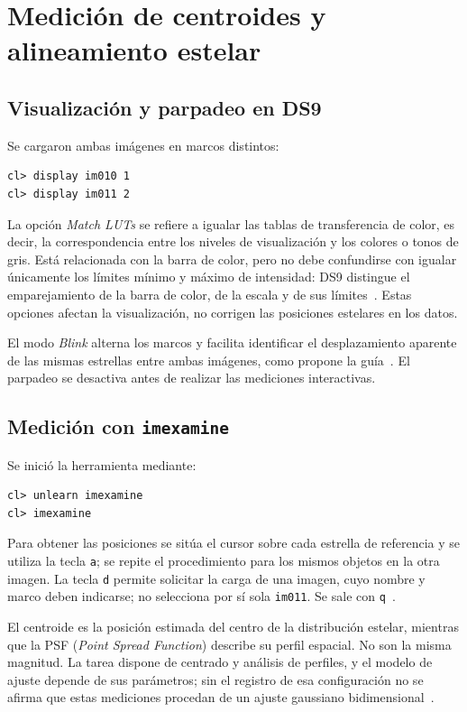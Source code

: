 \documentclass[11pt,a4paper]{article}
\begin{document}
\section{Medición de centroides y alineamiento estelar}

\subsection{Visualización y parpadeo en DS9}
Se cargaron ambas imágenes en marcos distintos:
\begin{verbatim}
cl> display im010 1
cl> display im011 2
\end{verbatim}

La opción \emph{Match LUTs} se refiere a igualar las tablas de
transferencia de color, es decir, la correspondencia entre los niveles
de visualización y los colores o tonos de gris. Está relacionada con
la barra de color, pero no debe confundirse con igualar únicamente los
límites mínimo y máximo de intensidad: DS9 distingue el emparejamiento
de la barra de color, de la escala y de sus límites~\cite{ds9}.
Estas opciones afectan la visualización, no corrigen las posiciones
estelares en los datos.

El modo \emph{Blink} alterna los marcos y facilita identificar el
desplazamiento aparente de las mismas estrellas entre ambas imágenes,
como propone la guía~\cite{guia}. El parpadeo se desactiva antes de
realizar las mediciones interactivas.

\subsection{Medición con \texttt{imexamine}}
Se inició la herramienta mediante:
\begin{verbatim}
cl> unlearn imexamine
cl> imexamine
\end{verbatim}
Para obtener las posiciones se sitúa el cursor sobre cada estrella de
referencia y se utiliza la tecla \texttt{a}; se repite el procedimiento
para los mismos objetos en la otra imagen. La tecla \texttt{d} permite
solicitar la carga de una imagen, cuyo nombre y marco deben indicarse;
no selecciona por sí sola \texttt{im011}. Se sale con
\texttt{q}~\cite{iraf}.

El centroide es la posición estimada del centro de la distribución
estelar, mientras que la PSF (\emph{Point Spread Function}) describe
su perfil espacial. No son la misma magnitud. La tarea dispone de
centrado y análisis de perfiles, y el modelo de ajuste depende de sus
parámetros; sin el registro de esa configuración no se afirma que estas
mediciones procedan de un ajuste gaussiano bidimensional~\cite{iraf}.
\end{document}
